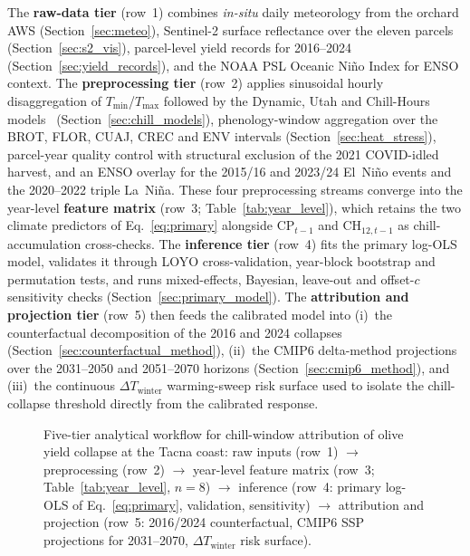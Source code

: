 \documentclass[agronomy,article,submit,pdftex,moreauthors]{Definitions/mdpi}
\begin{document}
The \textbf{raw-data tier} (row~1) combines \emph{in-situ} daily meteorology from the orchard AWS (Section~\ref{sec:meteo}), Sentinel-2 surface reflectance over the eleven parcels (Section~\ref{sec:s2_vis}), parcel-level yield records for 2016--2024 (Section~\ref{sec:yield_records}), and the NOAA PSL Oceanic Ni\~{n}o Index for ENSO context. The \textbf{preprocessing tier} (row~2) applies sinusoidal hourly disaggregation of $T_{\min}$/$T_{\max}$ followed by the Dynamic, Utah and Chill-Hours models~\cite{fishman1987a,fishman1987b,richardson1974,luedeling2018chillR} (Section~\ref{sec:chill_models}), phenology-window aggregation over the BROT, FLOR, CUAJ, CREC and ENV intervals (Section~\ref{sec:heat_stress}), parcel-year quality control with structural exclusion of the 2021 COVID-idled harvest, and an ENSO overlay for the 2015/16 and 2023/24 El~Ni\~{n}o events and the 2020--2022 triple La~Ni\~{n}a. These four preprocessing streams converge into the year-level \textbf{feature matrix} (row~3; Table~\ref{tab:year_level}), which retains the two climate predictors of Eq.~\eqref{eq:primary} alongside CP$_{t-1}$ and CH$_{12,t-1}$ as chill-accumulation cross-checks. The \textbf{inference tier} (row~4) fits the primary log-OLS model, validates it through LOYO cross-validation, year-block bootstrap and permutation tests, and runs mixed-effects, Bayesian, leave-out and offset-$c$ sensitivity checks (Section~\ref{sec:primary_model}). The \textbf{attribution and projection tier} (row~5) then feeds the calibrated model into (i)~the counterfactual decomposition of the 2016 and 2024 collapses (Section~\ref{sec:counterfactual_method}), (ii)~the CMIP6 delta-method projections over the 2031--2050 and 2051--2070 horizons (Section~\ref{sec:cmip6_method}), and (iii)~the continuous $\Delta T_{\text{winter}}$ warming-sweep risk surface used to isolate the chill-collapse threshold directly from the calibrated response.

\begin{figure}[H]
\centering
\resizebox{\textwidth}{!}{}
\caption{Five-tier analytical workflow for chill-window attribution of olive yield collapse at the Tacna coast: raw inputs (row~1) $\to$ preprocessing (row~2) $\to$ year-level feature matrix (row~3; Table~\ref{tab:year_level}, $n=8$) $\to$ inference (row~4: primary log-OLS of Eq.~\eqref{eq:primary}, validation, sensitivity) $\to$ attribution and projection (row~5: 2016/2024 counterfactual, CMIP6 SSP projections for 2031--2070, $\Delta T_{\text{winter}}$ risk surface).\label{fig:workflow}}
\end{figure}
\end{document}
